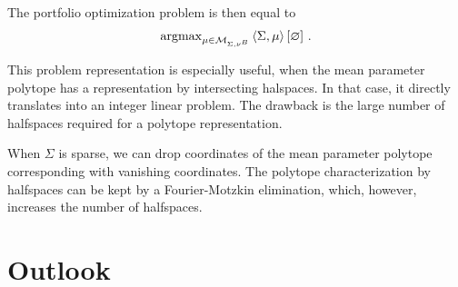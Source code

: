 \documentclass[aps,onecolumn,nofootinbib,pra]{article}
\begin{document}
    The portfolio optimization problem is then equal to
    \begin{align*}
        \mathrm{argmax}_{\mu\in\mathcal{M}_{\Sigma,\nu^{B}}} \left\langle \Sigma,\mu\right\rangle \left[ \varnothing \right] \, .
    \end{align*}

    This problem representation is especially useful, when the mean parameter polytope has a representation by intersecting halspaces.
    In that case, it directly translates into an integer linear problem.
    The drawback is the large number of halfspaces required for a polytope representation.

    When $\Sigma$ is sparse, we can drop coordinates of the mean parameter polytope corresponding with vanishing coordinates.
    The polytope characterization by halfspaces can be kept by a Fourier-Motzkin elimination, which, however, increases the number of halfspaces.

    \section{Outlook}
\end{document}
